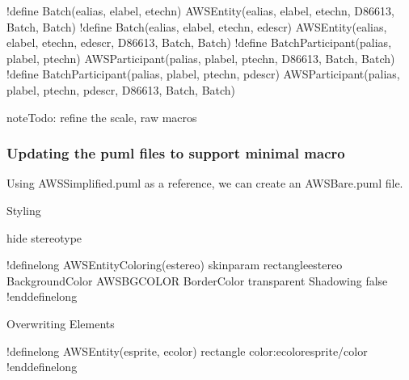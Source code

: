 \documentclass[letterpaper,10pt,english]{sphinxmanual}
\begin{document}
\begin{sphinxVerbatim}[commandchars=\\\{\}]
!define Batch(e\PYGZus{}alias, e\PYGZus{}label, e\PYGZus{}techn) AWSEntity(e\PYGZus{}alias, e\PYGZus{}label, e\PYGZus{}techn, \PYGZsh{}D86613, Batch, Batch)
!define Batch(e\PYGZus{}alias, e\PYGZus{}label, e\PYGZus{}techn, e\PYGZus{}descr) AWSEntity(e\PYGZus{}alias, e\PYGZus{}label, e\PYGZus{}techn, e\PYGZus{}descr, \PYGZsh{}D86613, Batch, Batch)
!define BatchParticipant(p\PYGZus{}alias, p\PYGZus{}label, p\PYGZus{}techn) AWSParticipant(p\PYGZus{}alias, p\PYGZus{}label, p\PYGZus{}techn, \PYGZsh{}D86613, Batch, Batch)
!define BatchParticipant(p\PYGZus{}alias, p\PYGZus{}label, p\PYGZus{}techn, p\PYGZus{}descr) AWSParticipant(p\PYGZus{}alias, p\PYGZus{}label, p\PYGZus{}techn, p\PYGZus{}descr, \PYGZsh{}D86613, Batch, Batch)
\end{sphinxVerbatim}

\begin{sphinxadmonition}{note}{\label{\detokenize{StdlibUnderTheHood/StdlibUnderstanding:id2}}Todo:}
refine the scale, raw macros
\end{sphinxadmonition}


\subsubsection{Updating the puml files to support minimal macro}
\label{\detokenize{StdlibUnderTheHood/StdlibUnderstanding:updating-the-puml-files-to-support-minimal-macro}}
Using AWSSimplified.puml as a reference, we can create an AWSBare.puml
file.

\begin{sphinxVerbatim}[commandchars=\\\{\}]
\PYGZsq{} Styling
\PYGZsq{} \PYGZsh{}\PYGZsh{}\PYGZsh{}\PYGZsh{}\PYGZsh{}\PYGZsh{}\PYGZsh{}\PYGZsh{}\PYGZsh{}\PYGZsh{}\PYGZsh{}\PYGZsh{}\PYGZsh{}\PYGZsh{}\PYGZsh{}\PYGZsh{}\PYGZsh{}\PYGZsh{}\PYGZsh{}\PYGZsh{}\PYGZsh{}\PYGZsh{}\PYGZsh{}\PYGZsh{}\PYGZsh{}\PYGZsh{}\PYGZsh{}\PYGZsh{}\PYGZsh{}\PYGZsh{}\PYGZsh{}\PYGZsh{}\PYGZsh{}\PYGZsh{}

hide stereotype

!definelong AWSEntityColoring(e\PYGZus{}stereo)
skinparam rectangle\PYGZlt{}\PYGZlt{}e\PYGZus{}stereo\PYGZgt{}\PYGZgt{} \PYGZob{}
    BackgroundColor AWS\PYGZus{}BG\PYGZus{}COLOR
    BorderColor transparent
    Shadowing false
\PYGZcb{}
!enddefinelong

\PYGZsq{} Overwriting Elements
\PYGZsq{} \PYGZsh{}\PYGZsh{}\PYGZsh{}\PYGZsh{}\PYGZsh{}\PYGZsh{}\PYGZsh{}\PYGZsh{}\PYGZsh{}\PYGZsh{}\PYGZsh{}\PYGZsh{}\PYGZsh{}\PYGZsh{}\PYGZsh{}\PYGZsh{}\PYGZsh{}\PYGZsh{}\PYGZsh{}\PYGZsh{}\PYGZsh{}\PYGZsh{}\PYGZsh{}\PYGZsh{}\PYGZsh{}\PYGZsh{}\PYGZsh{}\PYGZsh{}\PYGZsh{}\PYGZsh{}\PYGZsh{}\PYGZsh{}\PYGZsh{}\PYGZsh{}

!definelong AWSEntity(e\PYGZus{}sprite, e\PYGZus{}color)
rectangle \PYGZdq{}\PYGZlt{}color:e\PYGZus{}color\PYGZgt{}\PYGZlt{}\PYGZdl{}e\PYGZus{}sprite\PYGZgt{}\PYGZlt{}/color\PYGZgt{}\PYGZdq{}
!enddefinelong
\end{sphinxVerbatim}
\end{document}
